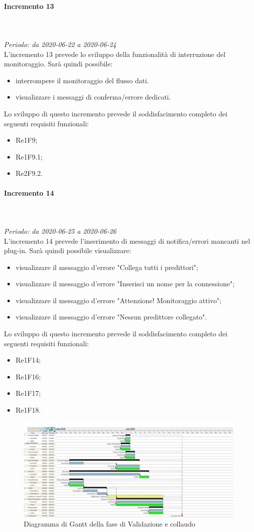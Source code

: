 \paragraph{Incremento 13}\mbox{} \\ \mbox{} \\ 
\textit{Periodo: da 2020-06-22 a 2020-06-24} \\
L'incremento 13 prevede lo sviluppo della funzionalità di interruzione del monitoraggio. Sarà quindi possibile: \begin{itemize}
\item interrompere il monitoraggio del flusso dati.
\item visualizzare i messaggi di conferma/errore dedicati.
\end{itemize}
Lo sviluppo di questo incremento prevede il soddisfacimento completo dei seguenti requisiti funzionali: \begin{itemize}
\item Re1F9;
\item Re1F9.1;
\item Re2F9.2.
\end{itemize}

\paragraph{Incremento 14}\mbox{} \\ \mbox{} \\ 
\textit{Periodo: da 2020-06-25 a 2020-06-26}\\
L'incremento 14 prevede l'inserimento di messaggi di notifica/errori mancanti nel plug-in. Sarà quindi possibile visualizzare: \begin{itemize}
\item visualizzare il messaggio d'errore "Collega tutti i predittori";
\item visualizzare il messaggio d'errore "Inserisci un nome per la connessione";
\item visualizzare il messaggio d'errore "Attenzione! Monitoraggio attivo";
\item visualizzare il messaggio d'errore "Nessun predittore collegato".
\end{itemize}
Lo sviluppo di questo incremento prevede il soddisfacimento completo dei seguenti requisiti funzionali: \begin{itemize}
\item Re1F14;
\item Re1F16;
\item Re1F17;
\item Re1F18.
\end{itemize}

\begin{figure}[H]
\centering
\includegraphics[scale=0.24]{./img/gantt/validazione_collaudo.png}
\caption{Diagramma di Gantt della fase di Validazione e collaudo}
\end{figure}